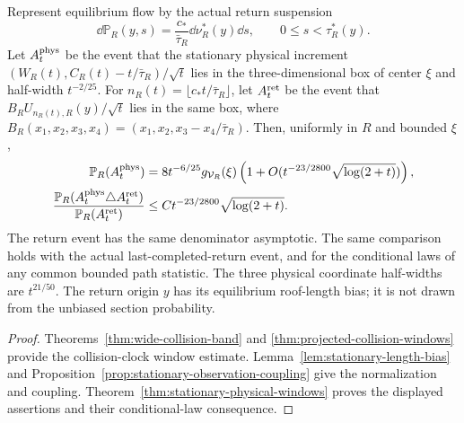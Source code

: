 \begin{maintheorem}
\label{thm:intro-stationary-physical-windows}
Represent equilibrium flow by the actual return suspension
\[
 \dd\mathbb P_R(y,s)=\frac{c_*}{\bar\tau_R}\dd\nu_R^*(y)\dd s,
 \qquad 0\le s<\tau_R^*(y).
\]
Let $A_t^{\rm phys}$ be the event that the stationary physical
increment $(W_R(t),C_R(t)-t/\bar\tau_R)/\sqrt t$ lies in the
three-dimensional box of center $\xi$ and half-width $t^{-2/25}$.
For $n_R(t)=\lfloor c_*t/\bar\tau_R\rfloor$, let $A_t^{\rm ret}$
be the event that $B_RU_{n_R(t),R}(y)/\sqrt t$ lies in the same box,
where $B_R(x_1,x_2,x_3,x_4)=(x_1,x_2,x_3-x_4/\bar\tau_R)$.
Then, uniformly in $R$ and bounded $\xi$,
\begin{align*}
 \mathbb P_R(A_t^{\rm phys})
 &=8t^{-6/25}g_{\mathcal V_R}(\xi)
       \left(1+O(t^{-23/2800}\sqrt{\log(2+t)})\right),\\
 \frac{\mathbb P_R(A_t^{\rm phys}\triangle A_t^{\rm ret})}
             {\mathbb P_R(A_t^{\rm ret})}
 &\le C t^{-23/2800}\sqrt{\log(2+t)}.
\end{align*}
The return event has the same denominator asymptotic. The same
comparison holds with the actual last-completed-return event, and
for the conditional laws of any common bounded path statistic.
The three physical coordinate half-widths are $t^{21/50}$.
The return origin $y$ has its equilibrium roof-length bias; it is
not drawn from the unbiased section probability.
\end{maintheorem}
\begin{proof}
Theorems~\ref{thm:wide-collision-band} and
\ref{thm:projected-collision-windows} provide the collision-clock
window estimate. Lemma~\ref{lem:stationary-length-bias} and
Proposition~\ref{prop:stationary-observation-coupling} give the
normalization and coupling. Theorem~\ref{thm:stationary-physical-windows}
proves the displayed assertions and their conditional-law consequence.
\end{proof}

